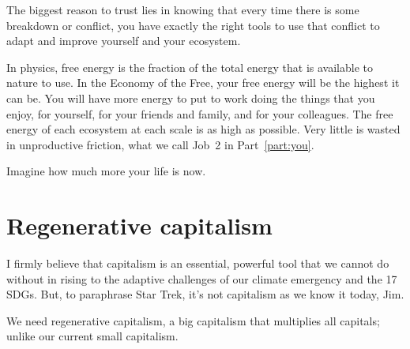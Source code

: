 The biggest reason to trust lies in knowing that every time there is some breakdown or conflict, you have exactly the right tools to use that conflict  to adapt and improve yourself and your ecosystem.


In physics, free energy is the fraction of the total energy  that is available to nature to use. In the Economy of the Free, your free energy will be the highest it can be. You will have more energy to put to work doing the things that you enjoy, for yourself, for your friends and family, and for your colleagues. The free energy of each ecosystem at each scale is as high as possible. Very little is wasted in unproductive friction, what we call Job~2 in Part~\ref{part:you}.


Imagine how much more your life is now.
\section{Regenerative capitalism}
\label{section:regenerative-capitalism}
I firmly believe that capitalism is an essential, powerful tool that we cannot do without in rising to the adaptive challenges of our climate emergency and the 17 SDGs. 
But, to paraphrase Star Trek, it's not capitalism as we know it today, Jim.


We need regenerative capitalism,   a big capitalism that multiplies all capitals; unlike our current small capitalism. 


